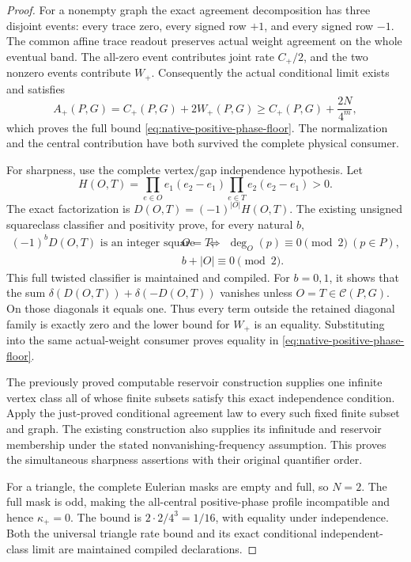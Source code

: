 \documentclass[11pt]{article}
\begin{document}
\begin{proof}
For a nonempty graph the exact agreement decomposition has three
disjoint events: every trace zero, every signed row \(+1\), and every
signed row \(-1\). The common affine trace readout preserves actual
weight agreement on the whole eventual band.
The all-zero event contributes joint rate \(C_+/2\), and the two
nonzero events contribute \(W_+\).
Consequently the actual conditional limit exists and satisfies
\[
       A_+(P,G)=C_+(P,G)+2W_+(P,G)
           \geq C_+(P,G)+\frac{2N}{4^m},
\]
which proves the full bound \eqref{eq:native-positive-phase-floor}.
The normalization and the central contribution have both survived
the complete physical consumer.

For sharpness, use the complete vertex/gap independence hypothesis.
Let
\[
 H(O,T)=
  \prod_{e\in O}e_1(e_2-e_1)
  \prod_{e\in T}e_2(e_2-e_1)>0.
\]
The exact factorization is
\(D(O,T)=(-1)^{|O|}H(O,T)\).
The existing unsigned squareclass classifier and positivity prove,
for every natural \(b\),
\begin{align*}
 (-1)^bD(O,T)\text{ is an integer square}
 \quad\Longleftrightarrow\quad&
 O=T,\quad \deg_O(p)\equiv0\pmod2\ (p\in P),\\
 &b+|O|\equiv0\pmod2.
\end{align*}
This full twisted classifier is maintained and compiled.
For \(b=0,1\), it shows that the sum
\(\delta(D(O,T))+\delta(-D(O,T))\) vanishes unless
\(O=T\in\mathcal C(P,G)\).
On those diagonals it equals one.
Thus every term outside the retained diagonal family is exactly zero
and the lower bound for \(W_+\) is an equality.
Substituting into the same actual-weight consumer proves equality in
\eqref{eq:native-positive-phase-floor}.

The previously proved computable reservoir construction supplies one
infinite vertex class all of whose finite subsets satisfy this exact
independence condition. Apply the just-proved conditional agreement
law to every such fixed finite subset and graph.
The existing construction also supplies its infinitude and reservoir
membership under the stated nonvanishing-frequency assumption.
This proves the simultaneous sharpness assertions with their original
quantifier order.

For a triangle, the complete Eulerian masks are empty and full,
so \(N=2\). The full mask is odd, making the all-central positive-phase
profile incompatible and hence \(\kappa_+=0\).
The bound is \(2\cdot2/4^3=1/16\), with equality under independence.
Both the universal triangle rate bound and its exact conditional
independent-class limit are maintained compiled declarations.
\end{proof}
\end{document}
